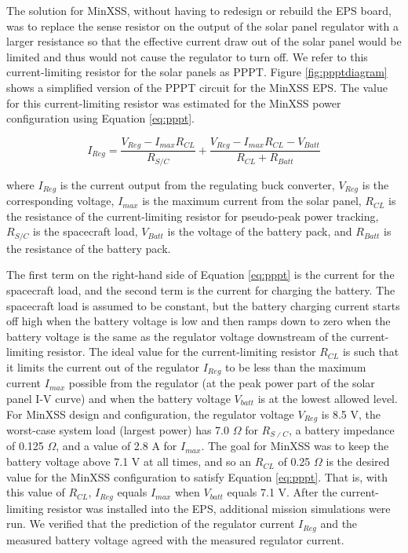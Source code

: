 The solution for MinXSS, without having to redesign or rebuild the EPS board, was to replace the sense resistor on the output of the solar panel regulator with a larger resistance so that the effective current draw out of the solar panel would be limited and thus would not cause the regulator to turn off. We refer to this current-limiting resistor for the solar panels as PPPT. Figure \ref{fig:ppptdiagram} shows a simplified version of the PPPT circuit for the MinXSS EPS.
The value for this current-limiting resistor was estimated for the MinXSS power configuration using Equation \ref{eq:pppt}. 

\begin{equation}
    I_{Reg} = \frac{V_{Reg} - I_{max}R_{CL}}{R_{S/C}} + \frac{V_{Reg} - I_{max}R_{CL} - V_{Batt}}{R_{CL} + R_{Batt}}
    \label{eq:pppt}
\end{equation}

\noindent where $I_{Reg}$ is the current output from the regulating buck converter, $V_{Reg}$ is the corresponding voltage, $I_{max}$ is the maximum current from the solar panel, $R_{CL}$ is the resistance of the current-limiting resistor for pseudo-peak power tracking, $R_{S/C}$ is the spacecraft load, $V_{Batt}$ is the voltage of the battery pack, and $R_{Batt}$ is the resistance of the battery pack. 

The first term on the right-hand side of Equation \ref{eq:pppt} is the current for the spacecraft load, and the second term is the current for charging the battery. The spacecraft load is assumed to be constant, but the battery charging current starts off high when the battery voltage is low and then ramps down to zero when the battery voltage is the same as the regulator voltage downstream of the current-limiting resistor. The ideal value for the current-limiting resistor $R_{CL}$ is such that it limits the current out of the regulator $I_{Reg}$ to be less than the maximum current $I_{max}$ possible from the regulator (at the peak power part of the solar panel I-V curve) and when the battery voltage $V_{batt}$ is at the lowest allowed level. For MinXSS design and configuration, the regulator voltage $V_{Reg}$ is 8.5 V, the worst-case system load (largest power) has 7.0 $\Omega$ for $R_{S∕C}$, a battery impedance of 0.125 $\Omega$, and a value of 2.8 A for $I_{max}$. The goal for MinXSS was to keep the battery voltage above 7.1 V at all times, and so an $R_{CL}$ of 0.25 $\Omega$ is the desired value for the MinXSS configuration to satisfy Equation \ref{eq:pppt}. That is, with this value of $R_{CL}$, $I_{Reg}$ equals $I_{max}$ when $V_{batt}$ equals 7.1 V. After the current-limiting resistor was installed into the EPS, additional mission simulations were run. We verified that the prediction of the regulator current $I_{Reg}$ and the measured battery voltage agreed with the measured regulator current.

